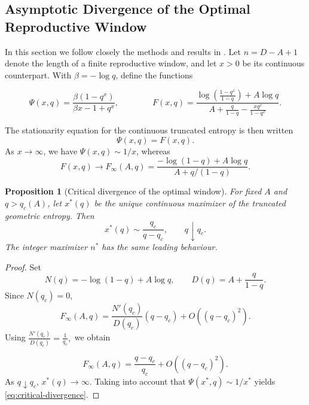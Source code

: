 \documentclass[11pt,a4paper]{amsart}
\newtheorem{proposition}[theorem]{Proposition}
\begin{document}
\FloatBarrier
{\color{black}
\subsection{Asymptotic Divergence of the Optimal Reproductive Window}

In this section we follow closely the methods and results in \cite{BuescuElaydiOliveira2026}. 
Let \(n=D-A+1\) denote the length of a finite reproductive window,
and let \(x>0\) be its continuous counterpart. With
\(\beta=-\log q\), define the functions 

\[
\Psi(x,q) =
\frac{\beta(1-q^x)}
{\beta x-1+q^x}, \qquad \qquad 
F(x,q)
=
\frac{\displaystyle
	\log\!\left(\frac{1-q^x}{1-q}\right)+A\log q}
{\displaystyle
	A+\frac{q}{1-q}-\frac{xq^x}{1-q^x}}.
\]




The stationarity equation for the continuous truncated entropy is then written  
\[
\Psi(x,q)=F(x,q).
\]
 As \(x\to\infty\), we have 
\(\Psi(x,q)\sim 1/x\), whereas
\begin{equation}
F(x,q)\longrightarrow
F_\infty(A,q)
=
\frac{-\log(1-q)+A\log q}
     {A+q/(1-q)}.
\label{eq:Finfty}
\end{equation}

\begin{proposition}[Critical divergence of the optimal window]
For fixed \(A\) and \(q>q_c(A)\), let \(x^*(q)\) be the unique
continuous maximizer of the truncated geometric entropy. Then
\begin{equation}
x^*(q)
\sim
\frac{q_c}{q-q_c},
\qquad
q\downarrow q_c.
\label{eq:critical-divergence}
\end{equation}
The integer maximizer \(n^*\) has the same leading behaviour.
\end{proposition}

\begin{proof}
Set
\[
N(q)=-\log(1-q)+A\log q,
\qquad
D(q)=A+\frac{q}{1-q}.
\]
Since \(N(q_c)=0\),
\[
F_\infty(A,q)
=
\frac{N'(q_c)}{D(q_c)}(q-q_c)
+
O\!\left((q-q_c)^2\right).
\]
Using ${\displaystyle \frac{N'(q_c)}{D(q_c)}
	=
	\frac{1}{q_c},}
$ we obtain

\begin{equation}
F_\infty(A,q)
=
\frac{q-q_c}{q_c}
+
O\!\left((q-q_c)^2\right).
\label{eq:Finfty-expansion}
\end{equation}
As \(q\downarrow q_c\),
\(x^*(q)\to\infty\). Taking into account that 
\(\Psi(x^*,q)\sim1/x^*\) yields
\eqref{eq:critical-divergence}.
\end{proof}

}
\end{document}

